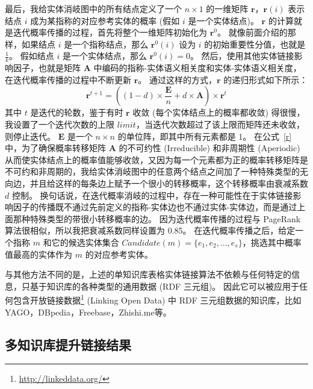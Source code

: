 最后，我给实体消岐图中的所有结点定义了一个 $n \times 1$ 的一维矩阵 $\bm{r}$，$\bm{r}(i)$ 表示结点 $i$ 成为某指称的对应参考实体的概率 (假如 $i$ 是一个实体结点)。
$\bm{r}$ 的计算就是迭代概率传播的过程，首先将整个一维矩阵初始化为 $\bm{r}^0$。
就像前面介绍的那样，如果结点 $i$ 是一个指称结点，那么 $\bm{r}^0(i)$ 设为 $i$ 的初始重要性分值，也就是 $\frac{1}{k}$。
假如结点 $i$ 是一个实体结点，那么 $\bm{r}^0(i)=0$。
然后，使用其他实体链接影响因子，也就是矩阵 $\bm{A}$ 中编码的指称-实体语义相关度和实体-实体语义相关度，在迭代概率传播的过程中不断更新 $\bm{r}$。
通过这样的方式，$\bm{r}$ 的递归形式如下所示：
\begin{equation}
\bm{r}^{t+1}=((1-d) \times \frac{\bm{E}}{n} + d \times \bm{A}) \times \bm{r}^t
\label{r}
\end{equation}
其中 $t$ 是迭代的轮数，鉴于有时 $\bm{r}$ 收敛 (每个实体结点上的概率都收敛) 得很慢，我设置了一个迭代次数的上限 $limit$，当迭代次数超过了该上限而矩阵还未收敛，则停止迭代。
$\bm{E}$ 是一个 $n \times n$ 的单位阵，即其中所有元素都是 1。
在公式~\ref{r} 中，为了确保概率转移矩阵 $\bm{A}$ 的不可约性 (Irreducible) 和非周期性 (Aperiodic) 从而使实体结点上的概率值能够收敛，又因为每一个元素都为正的概率转移矩阵是不可约和非周期的\cite{tauchen1986finite}，我给实体消岐图中的任意两个结点之间加了一种特殊类型的无向边，并且给这样的每条边上赋予一个很小的转移概率，这个转移概率由衰减系数 $d$ 控制。
换句话说，在迭代概率消岐的过程中，存在一种可能性在于实体链接影响因子的传播既不通过先前定义的指称-实体边也不通过实体-实体边，而是通过上面那种特殊类型的带很小转移概率的边。
因为迭代概率传播的过程与 PageRank\cite{page1999pagerank} 算法很相似，所以我把衰减系数同样设置为 0.85。
在迭代概率传播之后，给定一个指称 $m$ 和它的候选实体集合 $Candidate(m)=\{e_1, e_2, ..., e_s\}$，挑选其中概率值最高的实体作为 $m$ 的对应参考实体。\par

与其他方法不同的是，上述的单知识库表格实体链接算法不依赖与任何特定的信息，只基于知识库的各种类型的通用数据 (RDF 三元组)。
因此它可以被应用于任何包含开放链接数据\footnote{\url{http://linkeddata.org/}} (Linking Open Data) 中 RDF 三元组数据的知识库，比如 YAGO\cite{suchanek2007yago}，DBpedia\cite{auer2007dbpedia}，Freebase\cite{bollacker2008freebase}，Zhishi.me\cite{niu2011zhishi}等。


\subsection{多知识库提升链接结果}\label{multiple}

